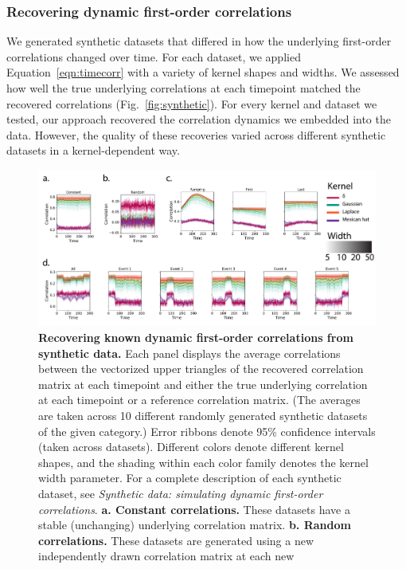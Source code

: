 \documentclass[english]{article}
\begin{document}
\subsubsection*{Recovering dynamic first-order correlations}
We generated synthetic datasets that differed in how the underlying first-order
correlations changed over time.  For each dataset, we applied
Equation~\ref{eqn:timecorr} with a variety of kernel shapes and
widths.  We assessed how well the true underlying correlations at each
timepoint matched the recovered correlations
(Fig.~\ref{fig:synthetic}).  For every kernel and dataset we tested,
our approach recovered the correlation dynamics we embedded into the
data.  However, the quality of these recoveries varied across
different synthetic datasets in a kernel-dependent way.


\begin{figure}[tp]
  \centering
  \includegraphics[width=\textwidth]{figs/synthetic_data}
  \caption{\textbf{Recovering known dynamic first-order correlations
      from synthetic data.}  Each panel displays the average
    correlations between the vectorized upper triangles of the
    recovered correlation matrix at each timepoint and either the true
    underlying correlation at each timepoint or a reference
    correlation matrix.  (The averages are taken across 10 different
    randomly generated synthetic datasets of the given category.)
    Error ribbons denote 95\% confidence intervals (taken across
    datasets). Different colors denote different kernel shapes, and
    the shading within each color family denotes the kernel width
    parameter.  For a complete description of each synthetic dataset,
    see \textit{Synthetic data: simulating dynamic first-order
      correlations}.  \textbf{a. Constant correlations.}  These
    datasets have a stable (unchanging) underlying correlation matrix.
    \textbf{b. Random correlations.}  These datasets are generated
    using a new independently drawn correlation matrix at each new
}
\end{figure}
\end{document}
